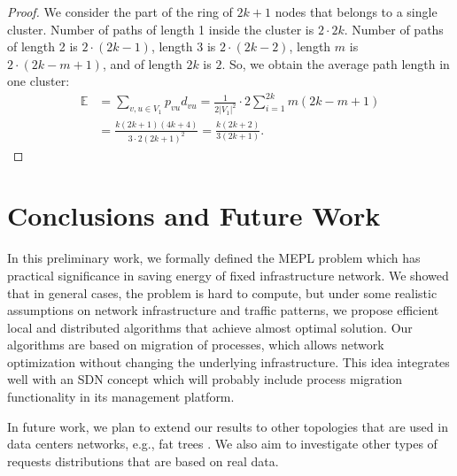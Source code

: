 \documentclass[conference]{IEEEtran}
\def\E{\mathbb{E}}
\begin{document}
\begin{proof}
We consider the part of the ring of $2k+1$ nodes that belongs to a single cluster. Number of paths of length 1 inside the cluster is $2\cdot 2k$. Number of paths of length 2 is $2\cdot (2k-1)$, length 3 is $2\cdot (2k-2)$, length $m$ is $2\cdot(2k-m+1)$, and of length $2k$ is $2$. So, we obtain the average path length in one cluster:
\begin{align*}
\E&=\sum_{v,u\in V_1}p_{vu}d_{vu}= \frac{1}{2\left| V_1\right |^2}\cdot2\sum_{i=1}^{2k} m(2k-m+1)\\
&=\frac{k(2k+1)(4k+4)}{3\cdot 2(2k+1)^2}=\frac{k(2k+2)}{3(2k+1)}.
\end{align*}

\end{proof}
 

\section{Conclusions and Future Work}\label{sec:conclusion}
In this preliminary work, we formally defined the MEPL problem which has practical significance in saving energy of fixed infrastructure network. We showed that in general cases, the problem is hard to compute, but under some realistic assumptions on network infrastructure and traffic patterns, we propose efficient local and distributed algorithms that achieve almost optimal solution. Our algorithms are based on migration of processes, which allows network optimization without changing the underlying infrastructure. This idea integrates well with an SDN concept which will probably include process migration functionality in its management platform.

In future work, we plan to extend our results to other topologies that are used in data centers networks, e.g., fat trees \cite{fat:trees:Leiserson:1985}. We also aim to investigate other types of requests distributions that are based on real data. 


\end{document}
